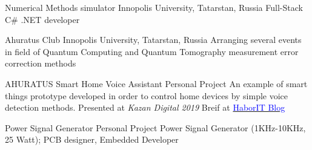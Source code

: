     {Numerical Methods simulator}
    {Innopolis University, Tatarstan, Russia}{}{}
    {Full-Stack C\# .NET developer}


    {Ahuratus Club}
    {Innopolis University, Tatarstan, Russia}{}{}
    {Arranging several events in field of Quantum Computing and Quantum Tomography measurement error correction methods}

    {AHURATUS Smart Home Voice Assistant}
    {Personal Project}{}{}
    {An example of smart things prototype developed in order to control home devices by simple voice detection methods. Presented at \textit{Kazan Digital 2019} Breif at \href{https://habr.com/en/post/475960/}{\textcolor{blue}{Habor\texttrademark IT Blog}}}

    {Power Signal Generator}
    {Personal Project}{}{}
    {Power Signal Generator (1KHz-10KHz, 25 Watt); PCB designer, Embedded Developer}
